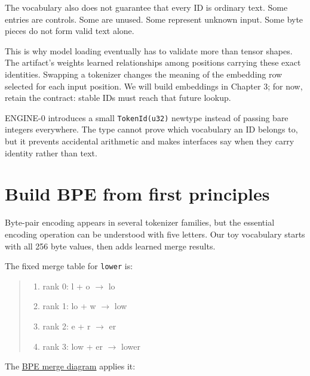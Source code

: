 The vocabulary also does not guarantee that every ID is ordinary text.
Some entries are controls. Some are unused. Some represent unknown
input. Some byte pieces do not form valid text alone.

This is why model loading eventually has to validate more than tensor
shapes. The artifact's weights learned relationships among positions
carrying these exact identities. Swapping a tokenizer changes the
meaning of the embedding row selected for each input position. We will
build embeddings in Chapter 3; for now, retain the contract: stable IDs
must reach that future lookup.

ENGINE-0 introduces a small \texttt{TokenId(u32)} newtype instead of
passing bare integers everywhere. The type cannot prove which vocabulary
an ID belongs to, but it prevents accidental arithmetic and makes
interfaces say when they carry identity rather than text.

\section{Build BPE from first
principles}\label{build-bpe-from-first-principles}

Byte-pair encoding appears in several tokenizer families, but the
essential encoding operation can be understood with five letters. Our
toy vocabulary starts with all 256 byte values, then adds learned merge
results.

The fixed merge table for \texttt{lower} is:

\begin{quote}
\begin{enumerate}
\item rank 0: l   + o    \(\longrightarrow\)  lo
\item rank 1: lo  + w    \(\longrightarrow\)  low
\item rank 2: e   + r    \(\longrightarrow\)  er
\item rank 3: low + er   \(\longrightarrow\)  lower
\end{enumerate}
\end{quote}

The
\href{https://github.com/hermonai/inside-the-llm-engine/blob/astra-visual-rewrite/diagrams/tokenizer/bpe-merge-process.txt}{BPE
merge diagram} applies it:


